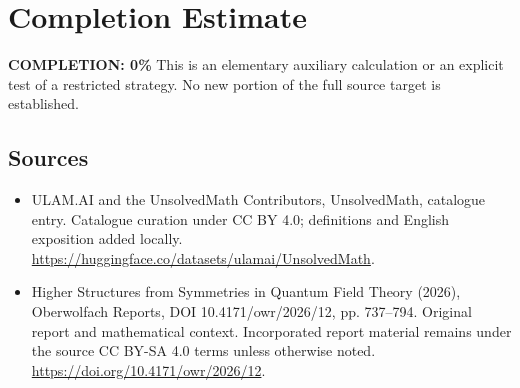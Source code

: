 \documentclass[11pt]{article}
\begin{document}
\section{Completion Estimate}
\noindent\textbf{COMPLETION: 0\%}
This is an elementary auxiliary calculation or an explicit test of a restricted strategy. No new portion of the full source target is established.

\subsection{Sources}
\begin{itemize}
\item[\hypertarget{source:statement:1}{S1}] ULAM.AI and the UnsolvedMath Contributors, UnsolvedMath, catalogue entry. Catalogue curation under CC BY 4.0; definitions and English exposition added locally.
\url{https://huggingface.co/datasets/ulamai/UnsolvedMath}.
\item[\hypertarget{source:statement:2}{S2}] Higher Structures from Symmetries in Quantum Field Theory (2026), Oberwolfach Reports, DOI 10.4171/owr/2026/12, pp. 737--794. Original report and mathematical context. Incorporated report material remains under the source CC BY-SA 4.0 terms unless otherwise noted.
\url{https://doi.org/10.4171/owr/2026/12}.
\end{itemize}
\label{end:statement}
\end{document}
